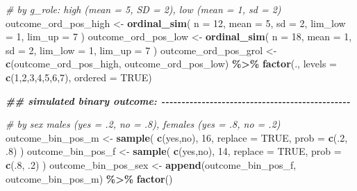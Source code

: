 \documentclass[
]{book}
\newenvironment{Shaded}{\begin{snugshade}}{\end{snugshade}}
\newcommand{\AttributeTok}[1]{\textcolor[rgb]{0.13,0.29,0.53}{#1}}
\newcommand{\CommentTok}[1]{\textcolor[rgb]{0.56,0.35,0.01}{\textit{#1}}}
\newcommand{\ConstantTok}[1]{\textcolor[rgb]{0.56,0.35,0.01}{#1}}
\newcommand{\DecValTok}[1]{\textcolor[rgb]{0.00,0.00,0.81}{#1}}
\newcommand{\DocumentationTok}[1]{\textcolor[rgb]{0.56,0.35,0.01}{\textbf{\textit{#1}}}}
\newcommand{\FunctionTok}[1]{\textcolor[rgb]{0.13,0.29,0.53}{\textbf{#1}}}
\newcommand{\NormalTok}[1]{#1}
\newcommand{\OtherTok}[1]{\textcolor[rgb]{0.56,0.35,0.01}{#1}}
\newcommand{\SpecialCharTok}[1]{\textcolor[rgb]{0.81,0.36,0.00}{\textbf{#1}}}
\newcommand{\StringTok}[1]{\textcolor[rgb]{0.31,0.60,0.02}{#1}}
\begin{document}
\begin{Shaded}
\begin{Highlighting}[]
\CommentTok{\# by g\_role: high (mean = 5, SD = 2), low (mean = 1, sd = 2)}
\NormalTok{outcome\_ord\_pos\_high }\OtherTok{\textless{}{-}} \FunctionTok{ordinal\_sim}\NormalTok{(}
  \AttributeTok{n =} \DecValTok{12}\NormalTok{, }\AttributeTok{mean =} \DecValTok{5}\NormalTok{, }\AttributeTok{sd =} \DecValTok{2}\NormalTok{, }\AttributeTok{lim\_low =} \DecValTok{1}\NormalTok{, }\AttributeTok{lim\_up =} \DecValTok{7}
\NormalTok{)}
\NormalTok{outcome\_ord\_pos\_low }\OtherTok{\textless{}{-}} \FunctionTok{ordinal\_sim}\NormalTok{(}
  \AttributeTok{n =} \DecValTok{18}\NormalTok{, }\AttributeTok{mean =} \DecValTok{1}\NormalTok{, }\AttributeTok{sd =} \DecValTok{2}\NormalTok{, }\AttributeTok{lim\_low =} \DecValTok{1}\NormalTok{, }\AttributeTok{lim\_up =} \DecValTok{7}
\NormalTok{)}
\NormalTok{outcome\_ord\_pos\_grol }\OtherTok{\textless{}{-}} \FunctionTok{c}\NormalTok{(outcome\_ord\_pos\_high, outcome\_ord\_pos\_low) }\SpecialCharTok{\%\textgreater{}\%}
  \FunctionTok{factor}\NormalTok{(., }\AttributeTok{levels =} \FunctionTok{c}\NormalTok{(}\DecValTok{1}\NormalTok{,}\DecValTok{2}\NormalTok{,}\DecValTok{3}\NormalTok{,}\DecValTok{4}\NormalTok{,}\DecValTok{5}\NormalTok{,}\DecValTok{6}\NormalTok{,}\DecValTok{7}\NormalTok{), }\AttributeTok{ordered =} \ConstantTok{TRUE}\NormalTok{)}


\DocumentationTok{\#\# simulated binary outcome: {-}{-}{-}{-}{-}{-}{-}{-}{-}{-}{-}{-}{-}{-}{-}{-}{-}{-}{-}{-}{-}{-}{-}{-}{-}{-}{-}{-}{-}{-}{-}{-}{-}{-}{-}{-}{-}{-}{-}{-}{-}{-}{-}{-}{-}{-}{-}}

\CommentTok{\# by sex males (yes = .2, no = .8), females (yes = .8, no = .2)}
\NormalTok{outcome\_bin\_pos\_m }\OtherTok{\textless{}{-}} \FunctionTok{sample}\NormalTok{(}
  \FunctionTok{c}\NormalTok{(}\StringTok{\textquotesingle{}yes\textquotesingle{}}\NormalTok{,}\StringTok{\textquotesingle{}no\textquotesingle{}}\NormalTok{), }\DecValTok{16}\NormalTok{, }\AttributeTok{replace =} \ConstantTok{TRUE}\NormalTok{, }\AttributeTok{prob =} \FunctionTok{c}\NormalTok{(.}\DecValTok{2}\NormalTok{, .}\DecValTok{8}\NormalTok{)}
\NormalTok{)}
\NormalTok{outcome\_bin\_pos\_f }\OtherTok{\textless{}{-}} \FunctionTok{sample}\NormalTok{(}
  \FunctionTok{c}\NormalTok{(}\StringTok{\textquotesingle{}yes\textquotesingle{}}\NormalTok{,}\StringTok{\textquotesingle{}no\textquotesingle{}}\NormalTok{), }\DecValTok{14}\NormalTok{, }\AttributeTok{replace =} \ConstantTok{TRUE}\NormalTok{, }\AttributeTok{prob =} \FunctionTok{c}\NormalTok{(.}\DecValTok{8}\NormalTok{, .}\DecValTok{2}\NormalTok{)}
\NormalTok{)}
\NormalTok{outcome\_bin\_pos\_sex }\OtherTok{\textless{}{-}} \FunctionTok{append}\NormalTok{(outcome\_bin\_pos\_f, outcome\_bin\_pos\_m) }\SpecialCharTok{\%\textgreater{}\%}
  \FunctionTok{factor}\NormalTok{()}



\end{Highlighting}
\end{Shaded}
\end{document}
